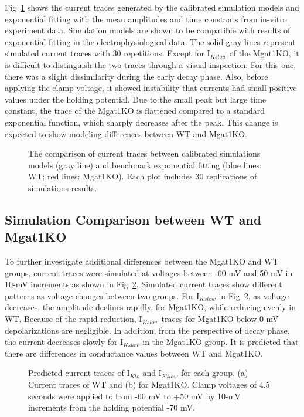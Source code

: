 \documentclass[10pt,letterpaper]{article}
\begin{document}
Fig~\ref{fig6} shows the current traces generated by the calibrated simulation models and exponential fitting with the mean amplitudes and time constants from in-vitro experiment data. Simulation models are shown to be compatible with results of exponential fitting in the electrophysiological data. The solid gray lines represent simulated current traces with 30 repetitions. Except for $\text{I}_{Kslow}$ of the Mgat1KO, it is difficult to distinguish the two traces through a visual inspection. For this one, there was a slight dissimilarity during the early decay phase. Also, before applying the clamp voltage, it showed instability that currents had small positive values under the holding potential. Due to the small peak but large time constant, the trace of the Mgat1KO is flattened compared to a standard exponential function, which sharply decreases after the peak. This change is expected to show modeling differences between WT and Mgat1KO.

\begin{figure}[!ht]
    \centering
    \caption{The comparison of current traces between calibrated simulations models (gray line) and benchmark exponential fitting (blue lines: WT; red lines: Mgat1KO). Each plot includes 30 replications of simulations results.}
    \label{fig6}
\end{figure}

\subsection*{Simulation Comparison between WT and Mgat1KO}
To further investigate additional differences between the Mgat1KO and WT groups, current traces were simulated at voltages between -60 mV and 50 mV in 10-mV increments as shown in Fig~\ref{fig7}. Simulated current traces show different patterns as voltage changes between two groups. For $\text{I}_{Kslow}$ in Fig~\ref{fig7}, as voltage decreases, the amplitude declines rapidly, for Mgat1KO, while reducing evenly in WT. Because of the rapid reduction, $\text{I}_{Kslow}$ traces for Mgat1KO below 0 mV depolarizations are negligible. In addition, from the perspective of decay phase, the current decreases slowly for $\text{I}_{Kslow}$ in the Mgat1KO group. It is predicted that there are differences in conductance values between WT and Mgat1KO.

\begin{figure}[!ht]
    \centering
    \caption{Predicted current traces of $\text{I}_{Kto}$ and $\text{I}_{Kslow}$ for each group. (a) Current traces of WT and (b) for Mgat1KO. Clamp voltages of 4.5 seconds were applied to from -60 mV to +50 mV by 10-mV increments from the holding potential -70 mV.}
    \label{fig7}
\end{figure}
\end{document}
